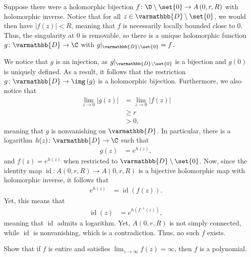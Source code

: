 \documentclass[11pt]{mypackage}
\renewcommand*{\mathbb}[1]{\varmathbb{#1}}
\begin{document}
\begin{solution}
  \footnotesize
  Suppose there were a holomorphic bijection $f\colon \D\setminus \set{0}\rightarrow A\left( 0,r,R \right)$ with holomorphic inverse. Notice that for all $z\in \mathbb{D}\setminus \set{0}$, we would then have $\left\vert f(z) \right\vert < R$, meaning that $f$ is necessarily locally bounded close to $0$. Thus, the singularity at $0$ is removable, so there is a unique holomorphic function $g\colon \mathbb{D}\rightarrow \C$ with $g|_{ \mathbb{D}\setminus \set{0} } = f$.\newline

  We notice that $ g $ is an injection, as $g|_{ \mathbb{D}\setminus \set{0} }$ is a bijection and $g(0)$ is uniquely defined. As a result, it follows that the restriction $g\colon \mathbb{D}\rightarrow \img\left( g \right)$ is a holomorphic bijection. Furthermore, we also notice that
  \begin{align*}
    \lim_{z\rightarrow 0} \left\vert g(z) \right\vert &= \lim_{z\rightarrow 0} \left\vert f(z) \right\vert\\
                                                      &\geq r\\
                                                      &> 0,
  \end{align*}
  meaning that $g$ is nonvanishing on $ \mathbb{D} $. In particular, there is a logarithm $h(z)\colon \mathbb{D}\rightarrow \C$ such that 
  \begin{align*}
    g(z) &= e^{h(z)},
  \end{align*}
  and $f(z) = e^{h(z)}$ when restricted to $ \mathbb{D}\setminus \set{0} $. Now, since the identity map $\operatorname{id}\colon A\left( 0,r,R \right)\rightarrow A\left( 0,r,R \right)$ is a bijective holomorphic map with holomorphic inverse, it follows that
  \begin{align*}
    e^{h(z)} &= \operatorname{id}\left( f(z) \right).
  \end{align*}
  Yet, this means that
  \begin{align*}
    \operatorname{id}(z) &= e^{h\left( f^{-1}(z) \right)},
  \end{align*}
  meaning that $ \operatorname{id} $ admits a logarithm. Yet, $A\left( 0,r,R \right)$ is not simply connected, while $ \operatorname{id} $ is nonvanishing, which is a contradiction. Thus, no such $f$ exists.
\end{solution}
\begin{problem}[Problem 4]
  Show that if $f$ is entire and satisfies $\lim_{z\rightarrow\infty} f\left( z \right) = \infty$, then $f$ is a polynomial.
\end{problem}
\end{document}

